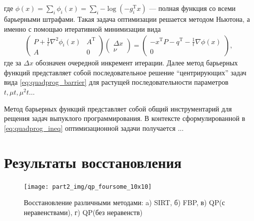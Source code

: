 где $\phi(x) = \sum_i \phi_i (x) = \sum_i {-\log{\left(- g_i^\mathrm{T}x \right)}}$ --- полная функция со всеми барьерными штрафами. 
Такая задача оптимизации решается методом Ньютона, а именно с помощью итеративной минимизации вида
\begin{gather}
\left(
  \begin{matrix}
  P + \frac 1 t \nabla^2 \phi_i(x) & A ^\mathrm{T} \\
  A & 0
  \end{matrix}
  \right)
  \left(
  \begin{matrix}
  \Delta x \\ \nu
  \end{matrix}
  \right)
  =
  \left(
  \begin{matrix}
  -x^\mathrm{T}P - q^\mathrm{T} - \frac 1 t \nabla \phi(x) \\ 0
  \end{matrix}
  \right),
\end{gather}
где за $\Delta x$ обозначен очередной инкремент итерации.
Далее метод барьерных функций представляет собой последовательное решение ``центрирующих'' задач вида \eqref{eq:quadprog_barrier} для растущей последовательности параметров $t, \mu t, \mu^2 t \dots$

Метод барьерных функций представляет собой общий инструментарий для рещения задач выпуклого программирования. 
В контексте сформулированной в \eqref{eq:quadprog_ineq} оптимизационной задачи получается ... 


\section{Результаты восстановления}
 \label{sect_2_resutls_qp_10x10}

\begin{figure}
  \centering
  \texttt{[image: part2\_img/qp\_foursome\_10x10]}
  \caption{Восстановление различными методами: a) SIRT, б) FBP, в) QP(с неравенствами), г) QP(без неравенств)}
  \label{im:quadprog}
\end{figure}

